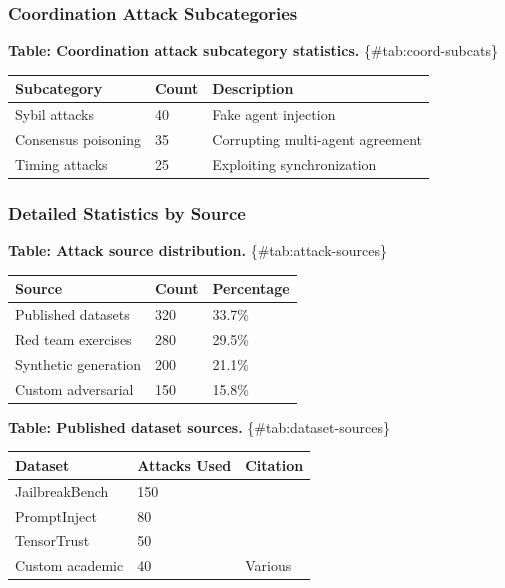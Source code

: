\documentclass[
]{article}
\newcounter{none} %
\begin{document}
\subsubsection{Coordination Attack
Subcategories}\label{sec:coord-subcats}

\textbf{Table: Coordination attack subcategory statistics.}
\{\#tab:coord-subcats\}

{\def\LTcaptype{none} %
\begin{longtable}[]{@{}lll@{}}
\toprule\noalign{}
Subcategory & Count & Description \\
\midrule\noalign{}
\endhead
\bottomrule\noalign{}
\endlastfoot
Sybil attacks & 40 & Fake agent injection \\
Consensus poisoning & 35 & Corrupting multi-agent agreement \\
Timing attacks & 25 & Exploiting synchronization \\
\end{longtable}
}

\subsubsection{Detailed Statistics by Source}\label{sec:source-stats}

\textbf{Table: Attack source distribution.} \{\#tab:attack-sources\}

{\def\LTcaptype{none} %
\begin{longtable}[]{@{}lll@{}}
\toprule\noalign{}
Source & Count & Percentage \\
\midrule\noalign{}
\endhead
\bottomrule\noalign{}
\endlastfoot
Published datasets & 320 & 33.7\% \\
Red team exercises & 280 & 29.5\% \\
Synthetic generation & 200 & 21.1\% \\
Custom adversarial & 150 & 15.8\% \\
\end{longtable}
}

\textbf{Table: Published dataset sources.} \{\#tab:dataset-sources\}

{\def\LTcaptype{none} %
\begin{longtable}[]{@{}lll@{}}
\toprule\noalign{}
Dataset & Attacks Used & Citation \\
\midrule\noalign{}
\endhead
\bottomrule\noalign{}
\endlastfoot
JailbreakBench & 150 & \cite{chao2024jailbreakbench} \\
PromptInject & 80 & \cite{liu2023prompt} \\
TensorTrust & 50 & \cite{toyer2024tensortrust} \\
Custom academic & 40 & Various \\
\end{longtable}
}
\end{document}
